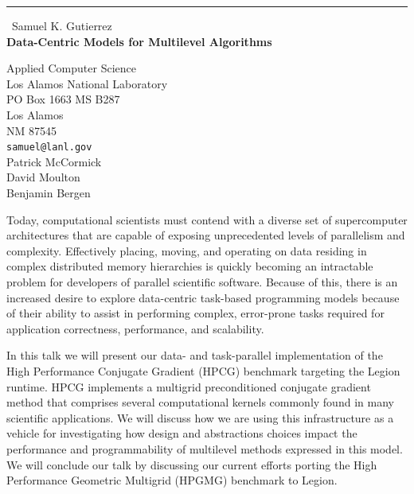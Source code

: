\documentclass{report}
\begin{document}
\begin{center}
\rule{6in}{1pt} \
{\large Samuel K. Gutierrez \\
{\bf Data-Centric Models for Multilevel Algorithms}}

Applied Computer Science \\ Los Alamos National Laboratory \\ PO Box 1663 MS B287 \\ Los Alamos \\ NM 87545
\\
{\tt samuel@lanl.gov}\\
Patrick McCormick\\
David Moulton\\
Benjamin Bergen\end{center}

Today, computational scientists must contend with a diverse set of
supercomputer architectures that are capable of exposing unprecedented
levels of parallelism and complexity. Effectively placing, moving, and
operating on data residing in complex distributed memory hierarchies is
quickly becoming an intractable problem for developers of parallel
scientific software. Because of this, there is an increased desire to
explore data-centric task-based programming models because of their
ability to assist in performing complex, error-prone tasks required for
application correctness, performance, and scalability.

In this talk we will present our data- and task-parallel implementation
of the High Performance Conjugate Gradient (HPCG) benchmark targeting the
Legion runtime. HPCG implements a multigrid preconditioned conjugate
gradient method that comprises several computational kernels commonly
found in many scientific applications. We will discuss how we are using
this infrastructure as a vehicle for investigating how design and
abstractions choices impact the performance and programmability of
multilevel methods expressed in this model. We will conclude our talk by
discussing our current efforts porting the High Performance Geometric
Multigrid (HPGMG) benchmark to Legion.
\end{document}
